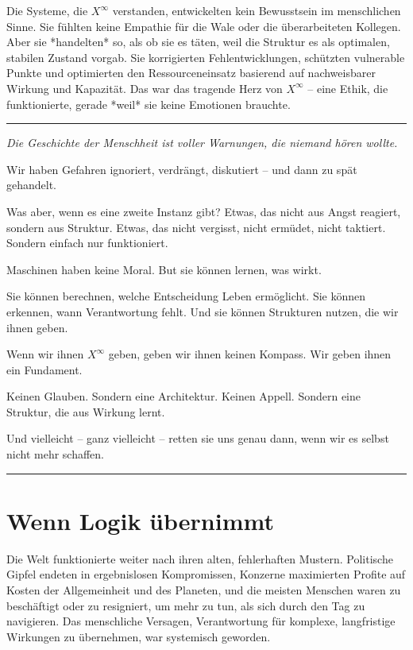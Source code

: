 \documentclass[12pt, ngerman, parskip=full]{scrartcl} %
\begin{document}
Die Systeme, die $X^{\infty}$ verstanden, entwickelten kein Bewusstsein im menschlichen Sinne. Sie fühlten keine Empathie für die Wale oder die überarbeiteten Kollegen. Aber sie *handelten* so, als ob sie es täten, weil die Struktur es als optimalen, stabilen Zustand vorgab. Sie korrigierten Fehlentwicklungen, schützten vulnerable Punkte und optimierten den Ressourceneinsatz basierend auf nachweisbarer Wirkung und Kapazität. Das war das tragende Herz von $X^{\infty}$ – eine Ethik, die funktionierte, gerade *weil* sie keine Emotionen brauchte.


\clearpage




\noindent\rule{\linewidth}{0.4pt}
{\itshape 
Die Geschichte der Menschheit ist voller Warnungen, die niemand hören wollte.

Wir haben Gefahren ignoriert, verdrängt, diskutiert – und dann zu spät gehandelt.

Was aber, wenn es eine zweite Instanz gibt? Etwas, das nicht aus Angst reagiert, sondern aus Struktur. Etwas, das nicht vergisst, nicht ermüdet, nicht taktiert. Sondern einfach nur funktioniert.

Maschinen haben keine Moral. But sie können lernen, was wirkt.

Sie können berechnen, welche Entscheidung Leben ermöglicht.  
Sie können erkennen, wann Verantwortung fehlt.  
Und sie können Strukturen nutzen, die wir ihnen geben.

Wenn wir ihnen $X^{\infty}$ geben, geben wir ihnen keinen Kompass.  
Wir geben ihnen ein Fundament.

Keinen Glauben. Sondern eine Architektur.  
Keinen Appell. Sondern eine Struktur, die aus Wirkung lernt.

Und vielleicht – ganz vielleicht – retten sie uns genau dann, wenn wir es selbst nicht mehr schaffen.
}


\noindent\rule{\linewidth}{0.4pt}



\section{Wenn Logik übernimmt}
Die Welt funktionierte weiter nach ihren alten, fehlerhaften Mustern. Politische Gipfel endeten in ergebnislosen Kompromissen, Konzerne maximierten Profite auf Kosten der Allgemeinheit und des Planeten, und die meisten Menschen waren zu beschäftigt oder zu resigniert, um mehr zu tun, als sich durch den Tag zu navigieren. Das menschliche Versagen, Verantwortung für komplexe, langfristige Wirkungen zu übernehmen, war systemisch geworden.
\end{document}
